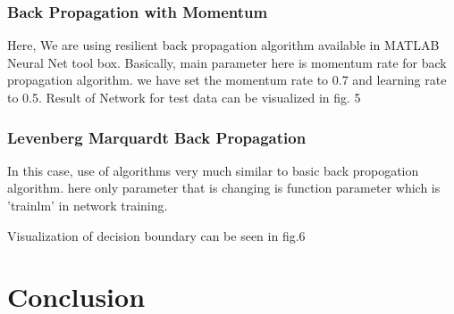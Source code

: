 \documentclass[conference]{IEEEtran}
\begin{document}
\subsubsection{Back Propagation with Momentum}
Here, We are using resilient back propagation algorithm available in MATLAB Neural Net tool box. Basically, main parameter here is momentum rate for back propagation algorithm. we have set the momentum rate to 0.7 and learning rate to 0.5. Result of Network for test data can be visualized in fig. 5\\

\subsubsection{Levenberg Marquardt Back Propagation}
In this case, use of algorithms very much similar to basic back propogation algorithm. here only parameter that is changing is function parameter which is  'trainlm' in network training.
 
 Visualization of decision boundary can be seen in fig.6\\


\section{Conclusion}
\\
\\
\\
\\
\\
\\
\\
\begin{IEEEbiography}


\end{IEEEbiography}
\end{document}
